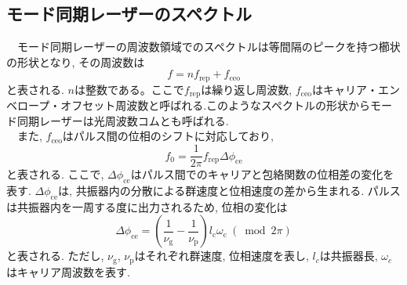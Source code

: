 \documentclass[uplatex, dvipdfmx, a4paper, report, papersize, 11pt]{jsbook}
\begin{document}
\subsection{モード同期レーザーのスペクトル}
　モード同期レーザーの周波数領域でのスペクトルは等間隔のピークを持つ櫛状の形状となり, その周波数は
\begin{equation}
  f = nf_{\mathrm{rep}} + f_{\mathrm{ceo}}
\end{equation}
と表される\cite{Femtosecondopticalfrequencycombs}. $n$は整数である。ここで$f_{\mathrm{rep}}$は繰り返し周波数, $f_{\mathrm{ceo}}$はキャリア・エンベロープ・オフセット周波数と呼ばれる.このようなスペクトルの形状からモード同期レーザーは光周波数コムとも呼ばれる.\\
　また, $f_{\mathrm{ceo}}$はパルス間の位相のシフトに対応しており,
 \begin{equation}
   f _ { 0 } = \frac { 1 } { 2 \pi } f _ { \mathrm { rep } } \Delta \phi _ { \mathrm { ce } }
 \end{equation}
と表される\cite{Femtosecondopticalfrequencycombs}. ここで, $\Delta \phi _ { \mathrm { ce } }$はパルス間でのキャリアと包絡関数の位相差の変化を表す. $\Delta \phi _ { \mathrm { ce } }$は, 共振器内の分散による群速度と位相速度の差から生まれる. パルスは共振器内を一周する度に出力されるため, 位相の変化は
\begin{equation}
  \Delta \phi _ { \mathrm { ce } } = \left( \frac { 1 } { \nu _ \mathrm{ g } } - \frac { 1 } { \nu _ \mathrm{ p } } \right) l _ \mathrm{ c } \omega _ \mathrm{ c }\ (\bmod 2 \pi)
\end{equation}
と表される\cite{Femtosecondopticalfrequencycombs}. ただし, $\nu _ \mathrm{ g }$, $\nu _ \mathrm{ p }$はそれぞれ群速度, 位相速度を表し, $l_c$は共振器長, $\omega_c$はキャリア周波数を表す.
\end{document}
